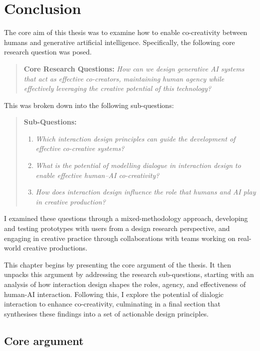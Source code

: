 \chapter[Conclusion]{Conclusion}\label{c:conclusion}

The core aim of this thesis was to examine how to enable co-creativity between humans and generative artificial intelligence. Specifically, the following core research question was posed.

\begin{quote}
\textbf{Core Research Questions:}
\emph{How can we design generative AI systems that act as effective co-creators, maintaining human agency while effectively leveraging the creative potential of this technology?}
\end{quote}

This was broken down into the following sub-questions:

\begin{quote}
\textbf{Sub-Questions:}
\begin{enumerate}
    \item \emph{Which interaction design principles can guide the development of effective co-creative systems?}
    \item \emph{What is the potential of modelling dialogue in interaction design to enable effective human--AI co-creativity?}
    \item \emph{How does interaction design influence the role that humans and AI play in creative production?}
\end{enumerate}
\end{quote}

I examined these questions through a mixed-methodology approach, developing and testing prototypes with users from a design research perspective, and engaging in creative practice through collaborations with teams working on real-world creative productions.

This chapter begins by presenting the core argument of the thesis. It then unpacks this argument by addressing the research sub-questions, starting with an analysis of how interaction design shapes the roles, agency, and effectiveness of human-AI interaction. Following this, I explore the potential of dialogic interaction to enhance co-creativity, culminating in a final section that synthesises these findings into a set of actionable design principles.

\section{Core argument}

